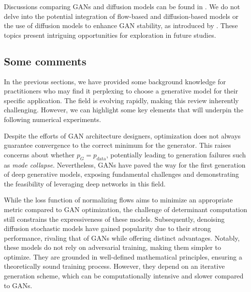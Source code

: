 \documentclass[fleqn,usenatbib]{mnras}
\begin{document}
Discussions comparing GANs and diffusion models can be found in \cite{dhariwal2021diffusion}. We do not delve into the potential integration of flow-based and diffusion-based models \citep[e.g.,][]{zhang2021diffusion,gong2021interpreting} or the use of diffusion models to enhance GAN stability, as introduced by \cite{Wang2023}. These topics present intriguing opportunities for exploration in future studies.
%

{\color{red}
\subsection{Some comments}
\label{sec-some-comments}
%

In the previous sections, we have provided some background knowledge for practitioners who may find it perplexing to choose a generative model for their specific application. The field is evolving rapidly, making this review inherently challenging. However, we can highlight some key elements that will underpin the following numerical experiments.

Despite the efforts of GAN architecture designers, optimization does not always guarantee convergence to the correct minimum for the generator. This raises concerns about whether $p_G = p_{\text{data}}$, potentially leading to generation failures such as \textit{mode collapse}. Nevertheless, GANs have paved the way for the first generation of deep generative models, exposing fundamental challenges and demonstrating the feasibility of leveraging deep networks in this field.  

While the loss function of normalizing flows aims to minimize an appropriate metric compared to GAN optimization, the challenge of determinant computation still constrains the expressiveness of these models. Subsequently, denoising diffusion stochastic models have gained popularity due to their strong performance, rivaling that of GANs while offering distinct advantages. Notably, these models do not rely on adversarial training, making them simpler to optimize. They are grounded in well-defined mathematical principles, ensuring a theoretically sound training process. However, they depend on an iterative generation scheme, which can be computationally intensive and slower compared to GANs.  

}
\end{document}
